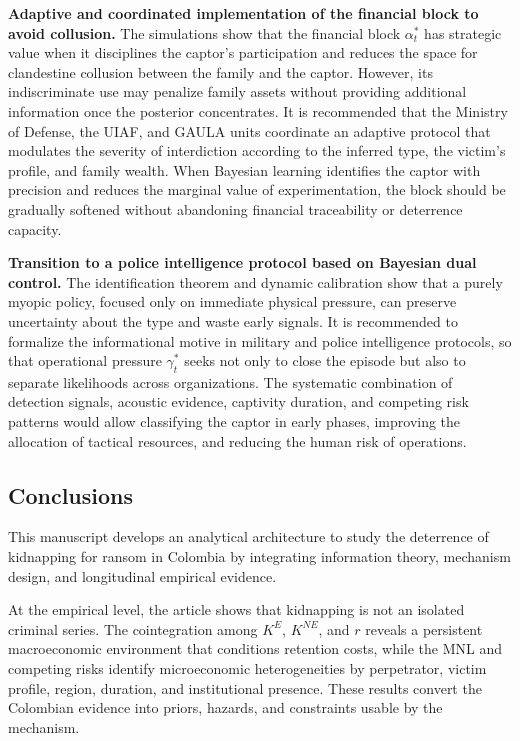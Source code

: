 \documentclass[review,authoryear,12pt]{elsarticle}
\theoremstyle{plain}
\theoremstyle{definition}
\newcommand{\1}{\mathbf{1}}
\begin{document}
\textbf{Adaptive and coordinated implementation of the financial block to avoid collusion.}\quad
The simulations show that the financial block $\alpha_t^\ast$ has strategic value when it disciplines the captor's participation and reduces the space for clandestine collusion between the family and the captor. However, its indiscriminate use may penalize family assets without providing additional information once the posterior concentrates. It is recommended that the Ministry of Defense, the UIAF, and GAULA units coordinate an adaptive protocol that modulates the severity of interdiction according to the inferred type, the victim's profile, and family wealth. When Bayesian learning identifies the captor with precision and reduces the marginal value of experimentation, the block should be gradually softened without abandoning financial traceability or deterrence capacity.

\textbf{Transition to a police intelligence protocol based on Bayesian dual control.}\quad
The identification theorem and dynamic calibration show that a purely myopic policy, focused only on immediate physical pressure, can preserve uncertainty about the type and waste early signals. It is recommended to formalize the informational motive in military and police intelligence protocols, so that operational pressure $\gamma_t^\ast$ seeks not only to close the episode but also to separate likelihoods across organizations. The systematic combination of detection signals, acoustic evidence, captivity duration, and competing risk patterns would allow classifying the captor in early phases, improving the allocation of tactical resources, and reducing the human risk of operations.

\subsection{Conclusions}

This manuscript develops an analytical architecture to study the deterrence of kidnapping for ransom in Colombia by integrating information theory, mechanism design, and longitudinal empirical evidence.

At the empirical level, the article shows that kidnapping is not an isolated criminal series. The cointegration among $K^E$, $K^{NE}$, and $r$ reveals a persistent macroeconomic environment that conditions retention costs, while the MNL and competing risks identify microeconomic heterogeneities by perpetrator, victim profile, region, duration, and institutional presence. These results convert the Colombian evidence into priors, hazards, and constraints usable by the mechanism.
\end{document}
